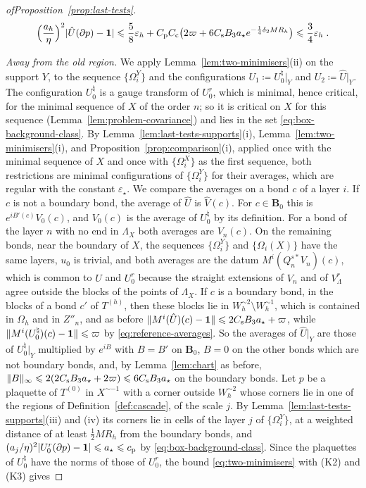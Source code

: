 \documentclass[11pt]{preprint}
\newcommand{\id}{\mathbf 1}
\DeclarePairedDelimiter{\abs}{\lvert}{\rvert}
\DeclarePairedDelimiter{\norm}{\lVert}{\rVert}
\numberwithin{equation}{section}
\begin{document}
\begin{proof}[ofProposition~\ref{prop:last-tests}]
\begin{equation}\label{eq:last-tests-near}
    \Bigl(\frac{a_h}{\eta}\Bigr)^2\abs{\hat U(\partial p) - \id} \leqslant \frac{5}{8}\varepsilon_h + C_{\mathrm p}C_{\mathrm c}\bigl(2\varpi + 6C_{\mathrm s}B_3a_\star e^{-\frac{1}{4}\delta_2MR_h}\bigr) \leqslant \frac{3}{4}\varepsilon_h\;.
\end{equation}

\emph{Away from the old region.} We apply Lemma~\ref{lem:two-minimisers}(ii) on the support $Y$, to the sequence $\{ \Omega^Y_i \}$ and the configurations $U_1 \coloneqq U^\natural_0|_Y$ and $U_2 \coloneqq \hat U|_Y$. The configuration $U^\natural_0$ is a gauge transform of $U^r_0$, which is minimal, hence critical, for the minimal sequence of $X$ of the order $n$; so it is critical on $X$ for this sequence (Lemma~\ref{lem:problem-covariance}) and lies in the set \eqref{eq:box-background-class}. By Lemma~\ref{lem:last-tests-supports}(i), Lemma~\ref{lem:two-minimisers}(i), and Proposition~\ref{prop:comparison}(i), applied once with the minimal sequence of $X$ and once with $\{ \Omega^X_i \}$ as the first sequence, both restrictions are minimal configurations of $\{ \Omega^Y_i \}$ for their averages, which are regular with the constant $\varepsilon_\star$. We compare the averages on a bond $c$ of a layer $i$. If $c$ is not a boundary bond, the average of $\hat U$ is $\hat V(c)$. For $c \in \mathbf B_0$ this is $e^{iB'(c)}V_0(c)$, and $V_0(c)$ is the average of $U^\natural_0$ by its definition. For a bond of the layer $n$ with no end in $\Lambda_X$ both averages are $V_n(c)$. On the remaining bonds, near the boundary of $X$, the sequences $\{ \Omega^Y_i \}$ and $\{ \Omega_i(X) \}$ have the same layers, $u_0$ is trivial, and both averages are the datum $M^i(Q^{s*}_nV_n)(c)$, which is common to $\hat U$ and $U^r_0$ because the straight extensions of $V_n$ and of $V^r_\Lambda$ agree outside the blocks of the points of $\Lambda_X$. If $c$ is a boundary bond, in the blocks of a bond $c'$ of $T^{(h)}$, then these blocks lie in $W_h^{\sim2} \setminus W_h^{\sim1}$, which is contained in $\Omega_h$ and in $Z''_n$, and as before $\norm{M^i(\hat U)(c) - \id} \leqslant 2C_{\mathrm s}B_3a_\star + \varpi$, while $\norm{M^i(U^\natural_0)(c) - \id} \leqslant \varpi$ by \eqref{eq:reference-averages}. So the averages of $\hat U|_Y$ are those of $U^\natural_0|_Y$ multiplied by $e^{iB}$ with $B = B'$ on $\mathbf B_0$, $B = 0$ on the other bonds which are not boundary bonds, and, by Lemma~\ref{lem:chart} as before, $\norm B_\infty \leqslant 2(2C_{\mathrm s}B_3a_\star + 2\varpi) \leqslant 6C_{\mathrm s}B_3a_\star$ on the boundary bonds. Let $p$ be a plaquette of $T^{(0)}$ in $X^{\sim-1}$ with a corner outside $W_h^{\sim2}$ whose corners lie in one of the regions of Definition~\ref{def:cascade}, of the scale $j$. By Lemma~\ref{lem:last-tests-supports}(iii) and (iv) its corners lie in cells of the layer $j$ of $\{ \Omega^Y_i \}$, at a weighted distance of at least $\frac{1}{2}MR_h$ from the boundary bonds, and $(a_j/\eta)^2\abs{U^r_0(\partial p) - \id} \leqslant a_\star \leqslant c_{\mathrm p}$ by \eqref{eq:box-background-class}. Since the plaquettes of $U^\natural_0$ have the norms of those of $U^r_0$, the bound \eqref{eq:two-minimisers} with (K2) and (K3) gives

\end{proof}
\end{document}

